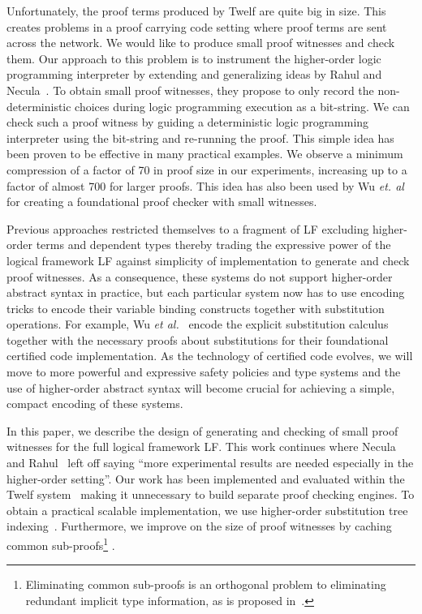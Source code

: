 \documentclass{llncs}
\begin{document}
Unfortunately, the proof terms produced by Twelf are quite big in
size.  This creates problems in a proof carrying code setting where
proof terms are sent across the network. We would like to produce
small proof witnesses and check them. Our approach to this problem is
to instrument the higher-order logic programming interpreter by
extending and generalizing ideas by Rahul and
Necula~\cite{Necula+01:oracle}. To obtain small proof witnesses, they
propose to only record the non-deterministic choices during logic
programming execution as a bit-string. We can check such a proof
witness by guiding a deterministic logic programming interpreter using
the bit-string and re-running the proof. This simple idea has been
proven to be effective in many practical examples. We observe a
minimum compression of a factor of 70 in proof size in our
experiments, increasing up to a factor of almost 700 for larger
proofs. This idea has also been used by Wu
{\em{et. al}}~\cite{Appel:PPDP03} for creating a foundational proof
checker with small witnesses.

Previous approaches restricted themselves to a fragment of LF
excluding higher-order terms and dependent types thereby trading the
expressive power of the logical framework LF against simplicity of
implementation to generate and check proof witnesses.  As a
consequence, these systems do not support higher-order abstract syntax
in practice, but each particular system now has to use encoding tricks
to encode their variable binding constructs together with substitution
operations. For example, Wu {\em et al.}~\cite{Appel:PPDP03} encode the
explicit substitution calculus~\cite{Abadi:POPL90} together with the
necessary proofs about substitutions for their foundational certified
code implementation. As the technology of certified code evolves, we
will move to more powerful and expressive safety policies and type
systems and the use of higher-order abstract syntax will become
crucial for achieving a simple, compact encoding of these systems.

In this paper, we describe the design of generating and checking of
small proof witnesses for the full logical framework LF. This work
continues where Necula and Rahul~\cite{Necula+01:oracle} left off
saying ``more experimental results are needed especially in the
higher-order setting''. Our work has been implemented and evaluated
within the Twelf system~\cite{Pfenning99cade} making it unnecessary to
build separate proof checking engines. To obtain a practical scalable
implementation, we use higher-order substitution tree
indexing~\cite{Pientka:ICLP03}. Furthermore, we improve on the size of
proof witnesses by caching common sub-proofs\footnote{Eliminating
common sub-proofs is an orthogonal problem to eliminating redundant
implicit type information, as is proposed in~\cite{Necula98lics}.}  .
\end{document}
